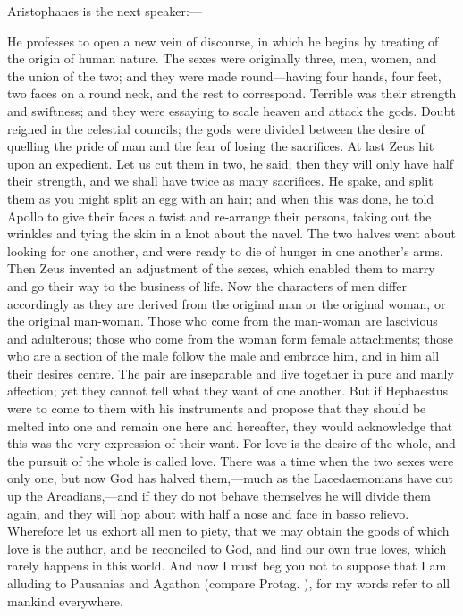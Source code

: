 \documentclass[11pt,letter]{article}
\begin{document}
\par  Aristophanes is the next speaker:—

\par  He professes to open a new vein of discourse, in which he begins by treating of the origin of human nature. The sexes were originally three, men, women, and the union of the two; and they were made round—having four hands, four feet, two faces on a round neck, and the rest to correspond. Terrible was their strength and swiftness; and they were essaying to scale heaven and attack the gods. Doubt reigned in the celestial councils; the gods were divided between the desire of quelling the pride of man and the fear of losing the sacrifices. At last Zeus hit upon an expedient. Let us cut them in two, he said; then they will only have half their strength, and we shall have twice as many sacrifices. He spake, and split them as you might split an egg with an hair; and when this was done, he told Apollo to give their faces a twist and re-arrange their persons, taking out the wrinkles and tying the skin in a knot about the navel. The two halves went about looking for one another, and were ready to die of hunger in one another's arms. Then Zeus invented an adjustment of the sexes, which enabled them to marry and go their way to the business of life. Now the characters of men differ accordingly as they are derived from the original man or the original woman, or the original man-woman. Those who come from the man-woman are lascivious and adulterous; those who come from the woman form female attachments; those who are a section of the male follow the male and embrace him, and in him all their desires centre. The pair are inseparable and live together in pure and manly affection; yet they cannot tell what they want of one another. But if Hephaestus were to come to them with his instruments and propose that they should be melted into one and remain one here and hereafter, they would acknowledge that this was the very expression of their want. For love is the desire of the whole, and the pursuit of the whole is called love. There was a time when the two sexes were only one, but now God has halved them,—much as the Lacedaemonians have cut up the Arcadians,—and if they do not behave themselves he will divide them again, and they will hop about with half a nose and face in basso relievo. Wherefore let us exhort all men to piety, that we may obtain the goods of which love is the author, and be reconciled to God, and find our own true loves, which rarely happens in this world. And now I must beg you not to suppose that I am alluding to Pausanias and Agathon (compare Protag. ), for my words refer to all mankind everywhere.
\end{document}
